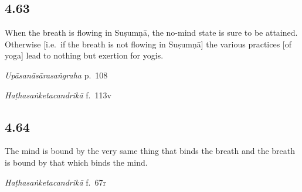 \begin{ekdosis}
\subsection*{4.63}
\begin{translation}[hp04_063]
When the breath is flowing in Suṣumṇā, the no-mind state is sure to be attained. Otherwise [i.e.~if the breath is not flowing in Suṣumṇā] the various practices [of yoga] lead to nothing but exertion for yogis.
\end{translation}


\begin{testimonia}[hp04_063]
\emph{Upāsanāsārasaṅgraha} p.~108
\begin{versinnote}
\end{versinnote}

\emph{Haṭhasaṅketacandrikā} f.~113v
\begin{versinnote}
\end{versinnote}
\end{testimonia}


\subsection*{4.64}
\begin{translation}[hp04_064]
The mind is bound by the very same thing that binds the breath and the breath is bound by that which binds the mind.
\end{translation}


\begin{testimonia}[hp04_064]

\emph{Haṭhasaṅketacandrikā} f.~67r
\begin{versinnote}
\end{versinnote}
\end{testimonia}


\end{ekdosis}
